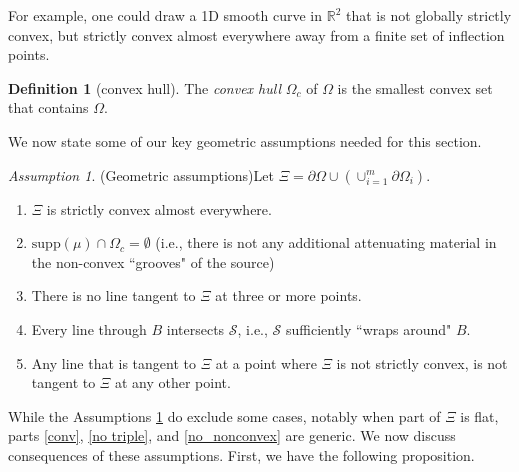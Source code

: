 \documentclass[a4paper,12pt]{amsart}
\numberwithin{equation}{section}
\theoremstyle{plain}
\numberwithin{theorem}{section}
\theoremstyle{definition}
\newtheorem{definition}[theorem]{Definition}
\theoremstyle{remark}
\theoremstyle{remark}
\theoremstyle{remark}
\newtheorem{assumption}[theorem]{Assumption}
\newcommand{\s}{\mathcal S}
\newcommand{\vx}{{\mathbf{x}}}
\begin{document}
For example, one could draw a 1D smooth curve in $\mathbb{R}^2$ that is not globally strictly convex, but strictly convex almost everywhere away from a finite set of inflection points.

\begin{definition}[convex hull] The \emph{convex hull} $\Omega_c$ of $\Omega$ is the smallest convex set that contains $\Omega$. 


\end{definition}

We now state some of our key geometric assumptions needed for this section.

\begin{assumption}{(Geometric assumptions)}\label{geo_ass}
Let $\Xi = \partial\Omega \cup (\cup_{i=1}^m \partial\Omega_i)$.
\begin{enumerate}
\item\label{conv} $\Xi$ is strictly convex almost everywhere.
\item\label{crit} $\text{supp}(\mu)  \cap \Omega_c = \emptyset$ (i.e., there is not any additional attenuating material in the non-convex ``grooves" of the source)
\item\label{no triple}  There is no line tangent to $\Xi$ at three or more points.
\item\label{all lines} Every line through $B$ intersects $\s$, i.e., $\s$ sufficiently ``wraps around" $B$.
\item \label{no_nonconvex} Any line that is tangent to $\Xi$ at a point where $\Xi$ is not strictly convex, is not tangent to $\Xi$ at any other point.
\end{enumerate}
\end{assumption}

While the Assumptions \ref{geo_ass} do exclude some cases, notably when part of $\Xi$ is flat, parts \eqref{conv}, \eqref{no triple}, and \eqref{no_nonconvex} are generic. We now discuss consequences of these assumptions. First, we have the following proposition.
\end{document}
